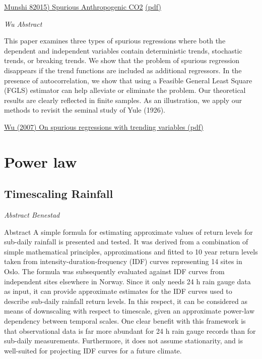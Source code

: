 \documentclass[
]{book}
\begin{document}
\href{https://papers.ssrn.com/sol3/papers.cfm?abstract_id=2642639}{Munshi 82015) Spurious Anthropogenic CO2}
\href{pdf/Munshi_2015_Spurious_Antropogenic_CO2.pdf}{(pdf)}

\emph{Wu Abstract}

This paper examines three types of spurious regressions where both the dependent and
independent variables contain deterministic trends, stochastic trends, or breaking trends. We
show that the problem of spurious regression disappears if the trend functions are included as
additional regressors. In the presence of autocorrelation, we show that using a Feasible General
Least Square (FGLS) estimator can help alleviate or eliminate the problem. Our theoretical
results are clearly reflected in finite samples. As an illustration, we apply our methods to revisit
the seminal study of Yule (1926).

\href{pdf/Wu_2007_Spurious_Trending.pdf}{Wu (2007) On spurious regressions with trending variables (pdf)}

\hypertarget{power-law}{%
\chapter{Power law}\label{power-law}}

\hypertarget{timescaling-rainfall}{%
\section{Timescaling Rainfall}\label{timescaling-rainfall}}

\emph{Abstract Benestad}

Abstract
A simple formula for estimating approximate values of return levels for sub-daily rainfall is
presented and tested. It was derived from a combination of simple mathematical principles,
approximations and fitted to 10 year return levels taken from intensity-duration-frequency (IDF)
curves representing 14 sites in Oslo. The formula was subsequently evaluated against IDF curves
from independent sites elsewhere in Norway. Since it only needs 24 h rain gauge data as input, it
can provide approximate estimates for the IDF curves used to describe sub-daily rainfall return
levels. In this respect, it can be considered as means of downscaling with respect to timescale, given
an approximate power-law dependency between temporal scales. One clear benefit with this
framework is that observational data is far more abundant for 24 h rain gauge records than for
sub-daily measurements. Furthermore, it does not assume stationarity, and is well-suited for
projecting IDF curves for a future climate.
\end{document}
